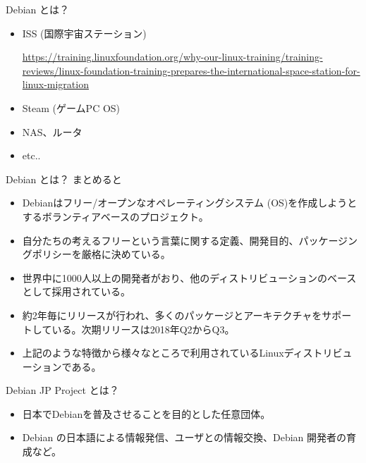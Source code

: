 \begin{frame}{Debian とは？}

\begin{itemize}
\item ISS (国際宇宙ステーション)
\begin{center}
\end{center}
{\tiny \url{https://training.linuxfoundation.org/why-our-linux-training/training-reviews/linux-foundation-training-prepares-the-international-space-station-for-linux-migration}}

\item Steam (ゲームPC OS)
\item NAS、ルータ
\item etc..
\end{itemize}

\end{frame}
\begin{frame}{Debian とは？}
まとめると\pause
\begin{itemize}[<+->]
\item Debianはフリー/オープンなオペレーティングシステム (OS)を作成しようとするボランティアベースのプロジェクト。
\item 自分たちの考えるフリーという言葉に関する定義、開発目的、パッケージングポリシーを厳格に決めている。
\item 世界中に1000人以上の開発者がおり、他のディストリビューションのベースとして採用されている。
\item 約2年毎にリリースが行われ、多くのパッケージとアーキテクチャをサポートしている。次期リリースは2018年Q2からQ3。
\item 上記のような特徴から様々なところで利用されているLinuxディストリビューションである。
\end{itemize}

\end{frame}

\begin{frame}{Debian JP Project とは？}
\pause
\begin{itemize}[<+->]
\item 日本でDebianを普及させることを目的とした任意団体。
\item Debian の日本語による情報発信、ユーザとの情報交換、Debian 開発者の育成など。
\end{itemize}
\end{frame}


